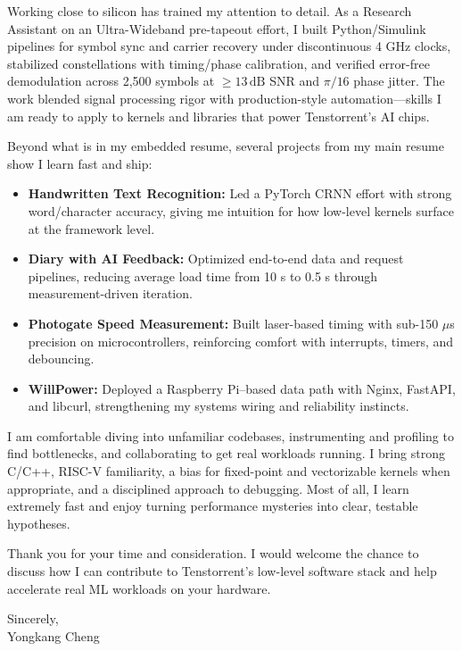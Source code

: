\documentclass[letterpaper,10pt]{article}
\begin{document}
Working close to silicon has trained my attention to detail. As a Research Assistant on an Ultra-Wideband pre-tapeout effort, I built Python/Simulink pipelines for symbol sync and carrier recovery under discontinuous 4 GHz clocks, stabilized constellations with timing/phase calibration, and verified error-free demodulation across 2,500 symbols at $\geq 13\,\mathrm{dB}$ SNR and $\pi/16$ phase jitter. The work blended signal processing rigor with production-style automation—skills I am ready to apply to kernels and libraries that power Tenstorrent’s AI chips.

Beyond what is in my embedded resume, several projects from my main resume show I learn fast and ship:
\begin{itemize}
    \item \textbf{Handwritten Text Recognition:} Led a PyTorch CRNN effort with strong word/character accuracy, giving me intuition for how low-level kernels surface at the framework level.
    \item \textbf{Diary with AI Feedback:} Optimized end-to-end data and request pipelines, reducing average load time from 10 s to 0.5 s through measurement-driven iteration.
    \item \textbf{Photogate Speed Measurement:} Built laser-based timing with sub-150 $\mu$s precision on microcontrollers, reinforcing comfort with interrupts, timers, and debouncing.
    \item \textbf{WillPower:} Deployed a Raspberry Pi–based data path with Nginx, FastAPI, and libcurl, strengthening my systems wiring and reliability instincts.
\end{itemize}

I am comfortable diving into unfamiliar codebases, instrumenting and profiling to find bottlenecks, and collaborating to get real workloads running. I bring strong C/C++, RISC-V familiarity, a bias for fixed-point and vectorizable kernels when appropriate, and a disciplined approach to debugging. Most of all, I learn extremely fast and enjoy turning performance mysteries into clear, testable hypotheses.

Thank you for your time and consideration. I would welcome the chance to discuss how I can contribute to Tenstorrent’s low-level software stack and help accelerate real ML workloads on your hardware.

Sincerely,\\[1.0em]
Yongkang Cheng
\end{document}

